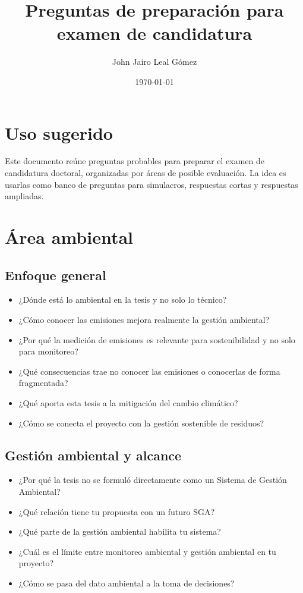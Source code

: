 \documentclass[11pt]{article}
\title{Preguntas de preparación para examen de candidatura}
\author{John Jairo Leal Gómez}
\date{\today}
\begin{document}
\maketitle

\section*{Uso sugerido}
Este documento reúne preguntas probables para preparar el examen de candidatura doctoral, organizadas por áreas de posible evaluación. La idea es usarlas como banco de preguntas para simulacros, respuestas cortas y respuestas ampliadas.

\section{Área ambiental}

\subsection*{Enfoque general}
\begin{itemize}[leftmargin=*]
    \item ¿Dónde está lo ambiental en la tesis y no solo lo técnico?
    \item ¿Cómo conocer las emisiones mejora realmente la gestión ambiental?
    \item ¿Por qué la medición de emisiones es relevante para sostenibilidad y no solo para monitoreo?
    \item ¿Qué consecuencias trae no conocer las emisiones o conocerlas de forma fragmentada?
    \item ¿Qué aporta esta tesis a la mitigación del cambio climático?
    \item ¿Cómo se conecta el proyecto con la gestión sostenible de residuos?
\end{itemize}

\subsection*{Gestión ambiental y alcance}
\begin{itemize}[leftmargin=*]
    \item ¿Por qué la tesis no se formuló directamente como un Sistema de Gestión Ambiental?
    \item ¿Qué relación tiene tu propuesta con un futuro SGA?
    \item ¿Qué parte de la gestión ambiental habilita tu sistema?
    \item ¿Cuál es el límite entre monitoreo ambiental y gestión ambiental en tu proyecto?
    \item ¿Cómo se pasa del dato ambiental a la toma de decisiones?
\end{itemize}
\end{document}
